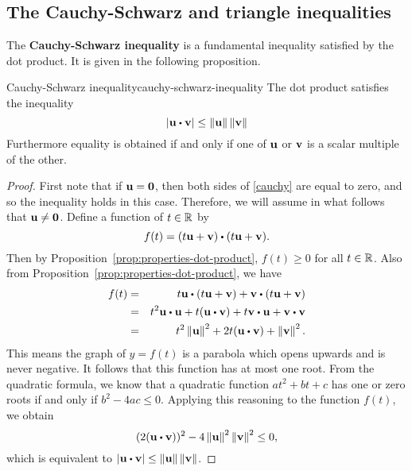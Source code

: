 \subsection{The Cauchy-Schwarz and triangle inequalities}

The \textbf{Cauchy-Schwarz inequality}%
 is a fundamental
inequality satisfied by the dot product.  It is given in the following
proposition.

\begin{proposition}{Cauchy-Schwarz inequality}{cauchy-schwarz-inequality}
  The dot product satisfies the inequality
  \begin{equation}\label{cauchy}
    \abs{\vect{u}\dotprod \vect{v}}\leq \norm{\vect{u}} \norm{\vect{v}}
  \end{equation}
  Furthermore equality is obtained if and only if one of $\vect{u}$ or $\vect{v}$ is a scalar multiple of the other.
\end{proposition}

\begin{proof}
  First note that if $\vect{u}=\vect{0}$, then both sides of
  \eqref{cauchy} are equal to zero, and so the inequality holds in
  this case. Therefore, we will assume in what follows that
  $\vect{u}\neq \vect{0}$.  Define a function of $t\in \mathbb{R}$ by
  \begin{equation*}
    f(t) =(t\vect{u}+\vect{v}) \dotprod (t\vect{u}+\vect{v}).
  \end{equation*}
  Then by Proposition~\ref{prop:properties-dot-product}, $f(t) \geq 0$
  for all $t\in \mathbb{R}$.  Also from
  Proposition~\ref{prop:properties-dot-product}, we have
  \begin{eqnarray*}
    f(t)
    &=& t\vect{u}\dotprod (t\vect{u}+\vect{v})
        + \vect{v}\dotprod (t\vect{u}+\vect{v}) \\
    &=& t^2\vect{u}\dotprod \vect{u}+t(\vect{u}\dotprod \vect{v})
        + t \vect{v}\dotprod \vect{u}
        + \vect{v}\dotprod \vect{v} \\
    &=& t^2\norm{\vect{u}}^2
        + 2t(\vect{u}\dotprod \vect{v})
        + \norm{\vect{v}}^2.
  \end{eqnarray*}
  This means the graph of $y=f(t)$ is a parabola which opens upwards
  and is never negative. It follows that this function has at most one
  root. From the quadratic formula, we know that a quadratic function
  $at^2+bt+c$ has one or zero roots if and only if $b^2-4ac\leq
  0$. Applying this reasoning to the function $f(t)$, we obtain
  \begin{equation*}
    (2(\vect{u}\dotprod\vect{v}))^2-4\norm{\vect{u}}^2\norm{\vect{v}}^2
    \leq 0,
  \end{equation*}
  which is equivalent to
  $\abs{\vect{u}\dotprod \vect{v}} \leq \norm{\vect{u}} \norm{\vect{v}}$.
\end{proof}


